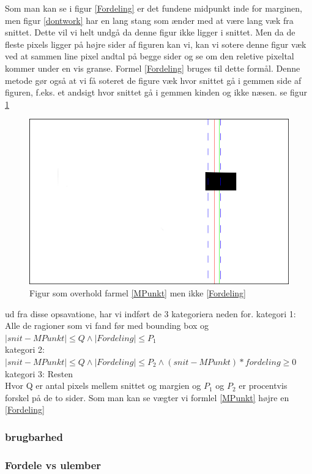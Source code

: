 {Som man kan se i figur \ref{Fordeling} er det fundene midpunkt inde for
marginen, men figur \ref{dontwork} har en lang stang som ænder med at
være lang væk fra snittet. Dette vil vi helt undgå da denne figur ikke
ligger i snittet. Men da de fleste pixels ligger på højre sider af
figuren kan vi, kan vi sotere denne figur væk ved at sammen line pixel
andtal på begge sider og se om den reletive pixeltal kommer under en vis
granse. Formel \ref{Fordeling} bruges til dette formål. Denne metode gør
også at vi få soteret de figure væk hvor snittet gå i gemmen side af
figuren, f.eks. et andsigt hvor snittet gå i gemmen kinden og ikke
næsen. se figur \ref{dontwork2}

\begin{figure}[h]
	\begin{center}
		\includegraphics[scale=0.5,angle=0]{afsnit/vores_implementation/billeder/udvidet_loesning/dontwork2.png}
	\end{center}
	\caption[]{Figur som overhold farmel \ref{MPunkt} men ikke \ref{Fordeling}}
	\label{dontwork2}
\end{figure}

ud fra disse opsavatione, har vi indført de 3 kategoriera neden for.
kategori 1: Alle de ragioner som vi fand før med bounding box og $ |snit - MPunkt| \leq Q \wedge |Fordeling| \leq P_1$ \\
kategori 2: $|snit - MPunkt| \leq Q \wedge |Fordeling| \leq P_2 \wedge (snit - MPunkt)*fordeling \geq 0$ \\
kategori 3: Resten\\

Hvor Q er antal pixels mellem snittet og margien og $P_1$ og $P_2$ er procentvis forskel på de to sider.
Som man kan se vægter vi formlel \ref{MPunkt} højre en \ref{Fordeling}


\subsubsection*{brugbarhed}
\subsubsection*{Fordele vs ulember}

}

